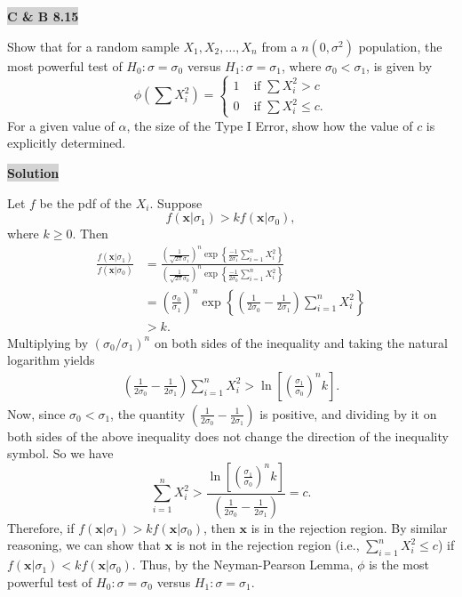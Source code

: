 \documentclass[12pt]{article}
\newcommand{\mybox}{%
    \collectbox{%
        \setlength{\fboxsep}{2pt}%
        \fbox{\BOXCONTENT}%
    }%
}
\begin{document}
\pagebreak

\noindent\mybox{\colorbox{lightgray}{\textbf{C \& B 8.15}}}\hspace{3mm}\hrulefill 

\noindent Show that for a random sample $X_1, X_2, \ldots, X_n$ from a $n(0, \sigma^2)$ population, the most powerful test of $H_0: \sigma = \sigma_0$ versus $H_1: \sigma = \sigma_1$, where $\sigma_0 < \sigma_1$, is given by
$$
\phi\left(\sum X_i^2\right) = 
\begin{cases}
1 & \text{ if } \sum X_i^2 > c \\
0 & \text { if } \sum X_i^2 \leq c.
\end{cases}
$$
For a given value of $\alpha$, the size of the Type I Error, show how the value of $c$ is explicitly determined. 

\vspace{3mm}

\noindent\mybox{\colorbox{lightgray}{\textbf{Solution}}} \hspace{3mm}\hrulefill

\noindent Let $f$ be the pdf of the $X_i$.  Suppose $$f(\textbf{x}|\sigma_1) > kf(\textbf{x}|\sigma_0),$$ where $k\geq 0$.  Then
\begin{align}
\frac{f(\textbf{x}|\sigma_1)}{f(\textbf{x}|\sigma_0)} &= \frac{\left(\frac{1}{\sqrt{2\pi}\sigma_1}\right)^n \exp\left\lbrace\frac{-1}{2\sigma_1}\sum\limits_{i=1}^n X_i^2 \right\rbrace}{\left(\frac{1}{\sqrt{2\pi}\sigma_0}\right)^n \exp\left\lbrace\frac{-1}{2\sigma_0}\sum\limits_{i=1}^n X_i^2 \right\rbrace} \\
&= \left(\frac{\sigma_0}{\sigma_1}\right)^n \exp\left\lbrace\left( \frac{1}{2\sigma_0} - \frac{1}{2\sigma_1}\right)\sum\limits_{i=1}^n X_i^2 \right\rbrace \\
&> k.
\end{align}
Multiplying by $(\sigma_0/\sigma_1)^n$ on both sides of the inequality and taking the natural logarithm yields
\begin{align}
\left( \frac{1}{2\sigma_0} - \frac{1}{2\sigma_1}\right)\sum\limits_{i=1}^n X_i^2 > \ln\left[\left(\frac{\sigma_1}{\sigma_0}\right)^n k\right].
\end{align}
Now, since $\sigma_0 < \sigma_1$, the quantity $\left( \frac{1}{2\sigma_0} - \frac{1}{2\sigma_1}\right)$ is positive, and dividing by it on both sides of the above inequality does not change the direction of the inequality symbol. So we have $$\sum\limits_{i=1}^n X_i^2 > \frac{\ln\left[\left(\frac{\sigma_1}{\sigma_0}\right)^n k\right]}{\left( \frac{1}{2\sigma_0} - \frac{1}{2\sigma_1}\right)} = c.$$ Therefore, if $f(\textbf{x}|\sigma_1) > k f(\textbf{x}|\sigma_0)$, then $\textbf{x}$ is in the rejection region. By similar reasoning, we can show that $\textbf{x}$ is not in the rejection region (i.e., $\sum\limits_{i=1}^n X_i^2 \leq c$) if $f(\textbf{x}|\sigma_1) < k f(\textbf{x}|\sigma_0).$ Thus, by the Neyman-Pearson Lemma, $\phi$ is the most powerful test of $H_0: \sigma = \sigma_0$ versus $H_1: \sigma = \sigma_1$.  
\end{document}
